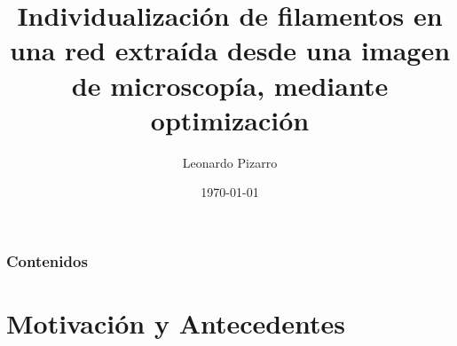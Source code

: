 \documentclass[aspectratio=169]{beamer}
\title[Individualizaci\'on de filamentos mediante optimizaci\'on]{Individualizaci\'on de filamentos en una red extra\'ida desde una imagen de microscop\'ia, mediante optimizaci\'on}
\author[L.\ Pizarro]{Leonardo Pizarro} %
\date{\today} %
\begin{document}
	{
		\maketitle
	}
	\addtocounter{framenumber}{-1} %

\begin{frame}
\frametitle{Contenidos} 
\tableofcontents
\end{frame}

\section{Motivaci\'on y Antecedentes}
\end{document}
